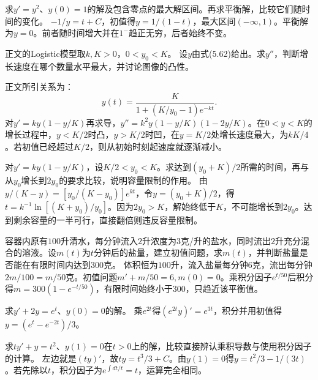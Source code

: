求\(y'=y^2\)、\(y(0)=1\)的解及包含零点的最大解区间。再求平衡解，比较它们随时间的变化。
\solutionanswer
\(-1/y=t+C\)，初值得\(y=1/(1-t)\)，最大区间\((-\infty,1)\)。平衡解为\(y=0\)。前者随时间增大并在\(1^-\)趋正无穷，后者始终不变。


正文的Logistic模型取\(k,K>0\)，\(0<y_0<K\)。
设\(y\)由式\textup{(5.62)}给出。求\(y''\)，判断增长速度在哪个数量水平最大，并讨论图像的凸性。

\par\smallskip\noindent 正文所引关系为：
\begin{equation*}
y(t)=\frac{K}{1+(K/y_0-1)e^{-kt}}.
\end{equation*}
\solutionanswer
对\(y'=ky(1-y/K)\)再求导，\(y''=k^2y(1-y/K)(1-2y/K)\)。在\(0<y<K\)的增长过程中，\(y<K/2\)时凸，\(y>K/2\)时凹，在\(y=K/2\)处增长速度最大，为\(kK/4\)。若初值已经超过\(K/2\)，则从初始时刻起速度就逐渐减小。


对\(y'=ky(1-y/K)\)，设\(K/2<y_0<K\)。求达到\((y_0+K)/2\)所需的时间，再与从\(y_0\)增长到\(2y_0\)的要求比较，说明容量限制的作用。
\solutionanswer
由\(y/(K-y)=[y_0/(K-y_0)]e^{kt}\)，令\(y=(y_0+K)/2\)，得\(t=k^{-1}\ln[(K+y_0)/y_0]\)。因为\(2y_0>K\)，解始终低于\(K\)，不可能增长到\(2y_0\)。达到剩余容量的一半可行，直接翻倍则违反容量限制。


容器内原有\(100\)升清水，每分钟流入\(2\)升浓度为\(3\)克/升的盐水，同时流出\(2\)升充分混合的溶液。设\(m(t)\)为\(t\)分钟后的盐量，建立初值问题，求\(m(t)\)，并判断盐量是否能在有限时间内达到\(300\)克。
\solutionanswer
体积恒为\(100\)升，流入盐量每分钟\(6\)克，流出每分钟\(2m/100=m/50\)克。初值问题\(m'+m/50=6,m(0)=0\)。乘积分因子\(e^{t/50}\)后积分得\(m=300(1-e^{-t/50})\)，有限时间始终小于\(300\)，只趋近该平衡值。


求\(y'+2y=e^t\)、\(y(0)=0\)的解。
\solutionanswer
乘\(e^{2t}\)得\((e^{2t}y)'=e^{3t}\)，积分并用初值得\(y=(e^t-e^{-2t})/3\)。


求\(ty'+y=t^2\)、\(y(1)=0\)在\(t>0\)上的解，比较直接辨认乘积导数与使用积分因子的计算。
\solutionanswer
左边就是\((ty)'\)，故\(ty=t^3/3+C\)。由\(y(1)=0\)得\(y=t^2/3-1/(3t)\)。若先除以\(t\)，积分因子为\(e^{\int dt/t}=t\)，运算完全相同。


